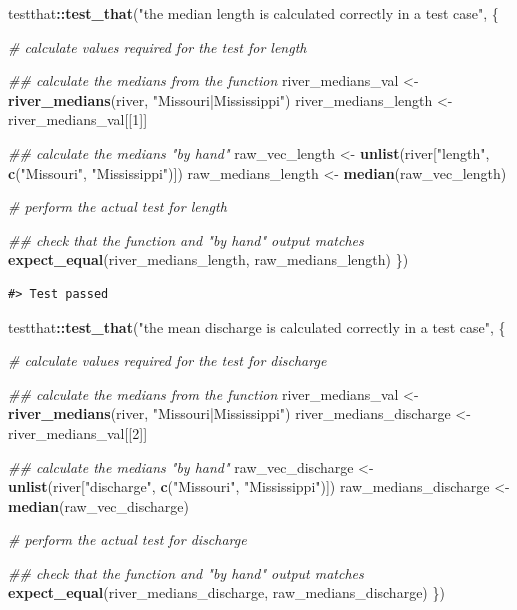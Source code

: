 \documentclass[
]{book}
\newenvironment{Shaded}{\begin{snugshade}}{\end{snugshade}}
\newcommand{\CommentTok}[1]{\textcolor[rgb]{0.56,0.35,0.01}{\textit{#1}}}
\newcommand{\DecValTok}[1]{\textcolor[rgb]{0.00,0.00,0.81}{#1}}
\newcommand{\KeywordTok}[1]{\textcolor[rgb]{0.13,0.29,0.53}{\textbf{#1}}}
\newcommand{\NormalTok}[1]{#1}
\newcommand{\OperatorTok}[1]{\textcolor[rgb]{0.81,0.36,0.00}{\textbf{#1}}}
\newcommand{\StringTok}[1]{\textcolor[rgb]{0.31,0.60,0.02}{#1}}
\begin{document}
\begin{Shaded}
\begin{Highlighting}[]
\NormalTok{testthat}\OperatorTok{::}\KeywordTok{test_that}\NormalTok{(}\StringTok{"the median length is calculated correctly in a test case"}\NormalTok{, \{}
  
  \CommentTok{# calculate values required for the test for length}

  \CommentTok{## calculate the medians from the function}
\NormalTok{  river_medians_val <-}\StringTok{ }\KeywordTok{river_medians}\NormalTok{(river, }\StringTok{"Missouri|Mississippi"}\NormalTok{)}
\NormalTok{  river_medians_length <-}\StringTok{ }\NormalTok{river_medians_val[[}\DecValTok{1}\NormalTok{]]}

  \CommentTok{## calculate the medians "by hand"}
\NormalTok{  raw_vec_length <-}\StringTok{ }\KeywordTok{unlist}\NormalTok{(river[}\StringTok{"length"}\NormalTok{, }\KeywordTok{c}\NormalTok{(}\StringTok{"Missouri"}\NormalTok{, }\StringTok{"Mississippi"}\NormalTok{)])}
\NormalTok{  raw_medians_length <-}\StringTok{ }\KeywordTok{median}\NormalTok{(raw_vec_length)}
  
  \CommentTok{# perform the actual test for length}

  \CommentTok{## check that the function and "by hand" output matches}
  \KeywordTok{expect_equal}\NormalTok{(river_medians_length, raw_medians_length)}
\NormalTok{\})}
\end{Highlighting}
\end{Shaded}

\begin{verbatim}
#> Test passed
\end{verbatim}

\begin{Shaded}
\begin{Highlighting}[]
\NormalTok{testthat}\OperatorTok{::}\KeywordTok{test_that}\NormalTok{(}\StringTok{"the mean discharge is calculated correctly in a test case"}\NormalTok{, \{}
  
  \CommentTok{# calculate values required for the test for discharge}

  \CommentTok{## calculate the medians from the function}
\NormalTok{  river_medians_val <-}\StringTok{ }\KeywordTok{river_medians}\NormalTok{(river, }\StringTok{"Missouri|Mississippi"}\NormalTok{)}
\NormalTok{  river_medians_discharge <-}\StringTok{ }\NormalTok{river_medians_val[[}\DecValTok{2}\NormalTok{]]}

  \CommentTok{## calculate the medians "by hand"}
\NormalTok{  raw_vec_discharge <-}\StringTok{ }\KeywordTok{unlist}\NormalTok{(river[}\StringTok{"discharge"}\NormalTok{, }\KeywordTok{c}\NormalTok{(}\StringTok{"Missouri"}\NormalTok{, }\StringTok{"Mississippi"}\NormalTok{)])}
\NormalTok{  raw_medians_discharge <-}\StringTok{ }\KeywordTok{median}\NormalTok{(raw_vec_discharge)}
  
  \CommentTok{# perform the actual test for discharge}

  \CommentTok{## check that the function and "by hand" output matches}
  \KeywordTok{expect_equal}\NormalTok{(river_medians_discharge, raw_medians_discharge)}
\NormalTok{\})}
\end{Highlighting}
\end{Shaded}
\end{document}
